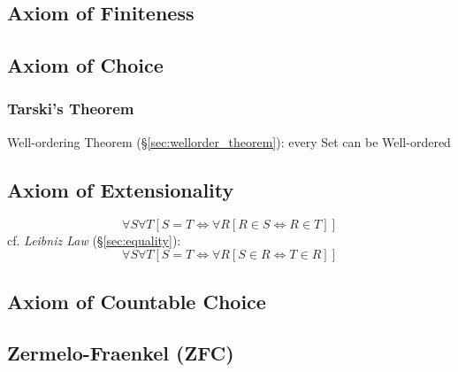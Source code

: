\subsection{Axiom of Finiteness}\label{sec:finiteness_axiom}

\subsection{Axiom of Choice}\label{sec:choice_axiom}

\subsubsection{Tarski's Theorem}\label{sec:tarskis_theorem}

Well-ordering Theorem (\S\ref{sec:wellorder_theorem}): every Set can
be Well-ordered



\subsection{Axiom of Extensionality}\label{sec:extensionality_axiom}

\[
  \forall S \forall T
    [S = T \Leftrightarrow \forall R [ R \in S \Leftrightarrow R \in T ]]
\]
cf. \emph{Leibniz Law} (\S\ref{sec:equality}):
\[
  \forall S \forall T
    [S = T \Leftrightarrow \forall R [ S \in R \Leftrightarrow T \in R ]]
\]


\subsection{Axiom of Countable Choice}\label{sec:countable_choice}

\subsection{Zermelo-Fraenkel (ZFC)}\label{sec:zermelo_fraenkel}

